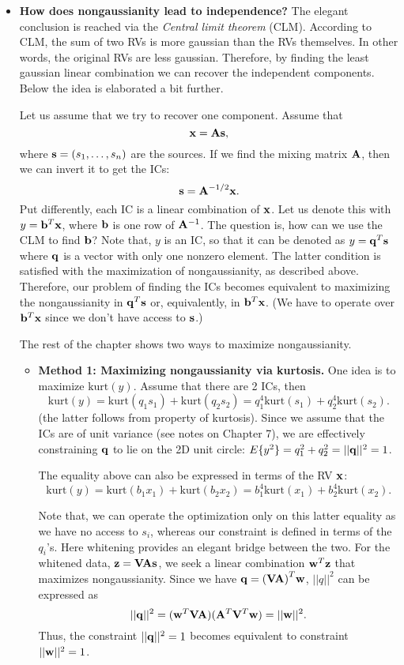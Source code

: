 \documentclass[a4paper]{book}
\begin{document}
\begin{itemize}
\item \textbf{How does nongaussianity lead to independence?} The elegant conclusion is reached via the \textit{Central limit theorem} (CLM). According to CLM, the sum of two \iid RVs is more gaussian than the RVs themselves. In other words, the original RVs are less gaussian. Therefore, by finding the least gaussian linear combination we can recover the independent components. Below the idea is elaborated a bit further.

Let us assume that we try to recover one component. Assume that $$\mathbf{x=As},$$ where $\mathbf{s}=(s_1,\hdots,s_n)$ are the sources. If we find the mixing matrix $\mathbf A$, then we can invert it to get the ICs: $$\mathbf{s=A}^{-1/2}\mathbf{x}.$$
Put differently, each IC is a linear combination of $\mathbf{x}$. Let us denote this with $y=\mathbf b^T \mathbf x$, where $\mathbf b$ is one row of $\mathbf A^{-1}$. The question is, how can we use the CLM to find $\mathbf b$? Note that, $y$ is an IC, so that it can be denoted as $y =\mathbf{q}^T \mathbf s$ where $\mathbf q$ is a vector with only one nonzero element. The latter condition is satisfied with the maximization of nongaussianity, as described above. Therefore, our problem of finding the ICs becomes equivalent to maximizing the nongaussianity in $\mathbf{q}^T \mathbf s$ or, equivalently, in $\mathbf b ^T \mathbf x$. (We have to operate over $\mathbf b^T \mathbf x$ since we don't have access to $\mathbf s$.)

The rest of the chapter shows two ways to maximize nongaussianity.

\begin{itemize}

\item \textbf{Method 1: Maximizing nongaussianity via kurtosis.} One idea is to maximize $\text{kurt}(y).$ Assume that there are 2 ICs, then $$\text{kurt}(y)=\text{kurt}(q_1 s_1)+\text{kurt}(q_2 s_2) = q_1^4\text{kurt}( s_1)+q_2 ^4\text{kurt}(s_2). $$ 
(the latter follows from property of kurtosis). Since we assume that the ICs are of unit variance (see notes on Chapter 7), we are effectively constraining $\mathbf q$ to lie on the 2D unit circle: $E\{y^2\}=q_1^2+q_2^2=||\mathbf q||^2=1$.

The equality above can also be expressed in terms of the RV $\mathbf x$:%
$$\text{kurt}(y)=\text{kurt}(b_1 x_1)+\text{kurt}(b_2 x_2) = b_1^4\text{kurt}(x_1)+b_2 ^4\text{kurt}(x_2).$$

Note that, we can operate the optimization only on this latter equality as we have no access to $s_i$, whereas our constraint is defined in terms of the $q_i$'s. Here whitening provides an elegant bridge between the two. For the whitened data, $\mathbf{z=VAs}$, we seek a linear combination $\mathbf w^T \mathbf z$ that maximizes nongaussianity. Since we have $\mathbf{q=(VA)}^T \mathbf{w}$, $||q||^2$ can be expressed as 
$$||\mathbf q||^2 = (\mathbf w^T \mathbf{VA})(\mathbf A^T \mathbf V^T \mathbf w)=||\mathbf w||^2.$$ Thus, the constraint $||\mathbf q||^2=1$ becomes equivalent to constraint $||\mathbf w||^2=1$.


\end{itemize}
\end{itemize}
\end{document}
